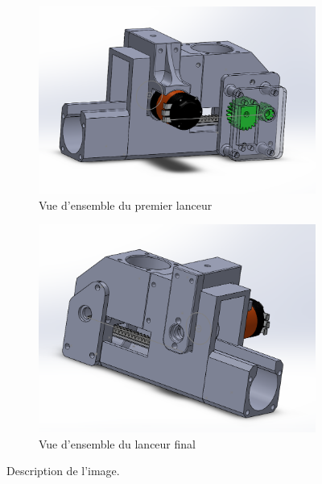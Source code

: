 \begin{figure}[h!]
    \centering

    \begin{subfigure}{0.4\linewidth}
        \centering
        \includegraphics[width=\linewidth]{img/s2/cad/lanceur1}
        \caption{Vue d'ensemble du premier lanceur}
        \label{fig:a1-s2-cad-lanceur1}
    \end{subfigure}
    \begin{subfigure}{0.4\linewidth}
        \centering
        \includegraphics[width=\linewidth]{img/s2/cad/lanceur2}
        \caption{Vue d'ensemble du lanceur final}
        \label{fig:a1-s2-cad-lanceur2}
    \end{subfigure}

    \caption{Description de l'image.}
    \label{fig:template-example-flottante}
\end{figure}


